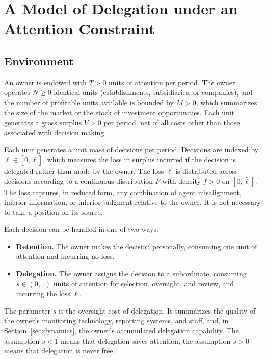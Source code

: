 \documentclass[11pt,a4paper]{article}
\theoremstyle{plain}
\newcommand{\lbar}{\bar{\ell}}
\begin{document}
\section{A Model of Delegation under an Attention Constraint}\label{sec:model}

\subsection{Environment}

An owner is endowed with $T > 0$ units of attention per period. The owner operates $N \ge 0$ identical units (establishments, subsidiaries, or companies), and the number of profitable units available is bounded by $M > 0$, which summarizes the size of the market or the stock of investment opportunities. Each unit generates a gross surplus $V > 0$ per period, net of all costs other than those associated with decision making.

Each unit generates a unit mass of decisions per period. Decisions are indexed by $\ell \in [0, \lbar]$, which measures the loss in surplus incurred if the decision is delegated rather than made by the owner. The loss $\ell$ is distributed across decisions according to a continuous distribution $F$ with density $f > 0$ on $[0, \lbar]$. The loss captures, in reduced form, any combination of agent misalignment, inferior information, or inferior judgment relative to the owner. It is not necessary to take a position on its source.

Each decision can be handled in one of two ways.
\begin{itemize}[leftmargin=*,topsep=3pt,itemsep=2pt]
  \item \textbf{Retention.} The owner makes the decision personally, consuming one unit of attention and incurring no loss.
  \item \textbf{Delegation.} The owner assigns the decision to a subordinate, consuming $s \in (0, 1)$ units of attention for selection, oversight, and review, and incurring the loss $\ell$.
\end{itemize}

The parameter $s$ is the oversight cost of delegation. It summarizes the quality of the owner's monitoring technology, reporting systems, and staff, and, in Section~\ref{sec:dynamics}, the owner's accumulated delegation capability. The assumption $s < 1$ means that delegation saves attention; the assumption $s > 0$ means that delegation is never free.
\end{document}

